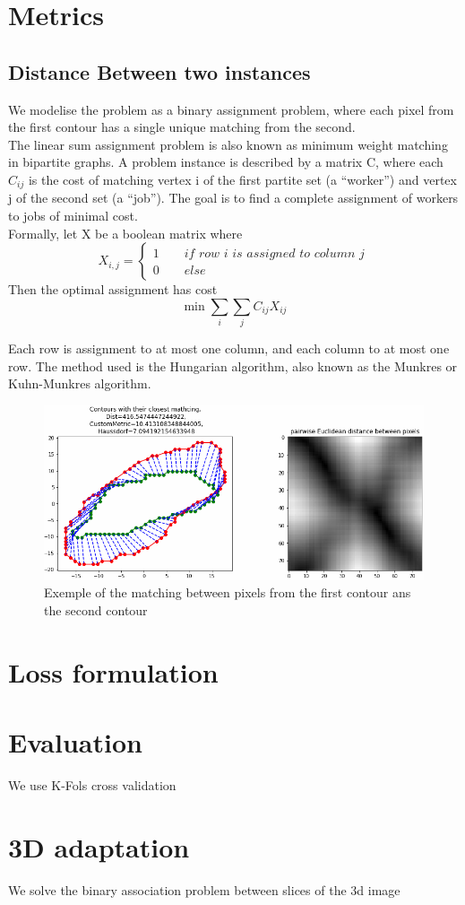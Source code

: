 \documentclass[main.tex]{subfiles}
\begin{document}
\section{Metrics}
\subsection{Distance Between two instances}
We modelise the problem as a binary assignment problem, where each pixel from the first contour has a single unique matching from the second.\\

The linear sum assignment problem is also known as minimum weight matching in bipartite graphs. A problem instance is described by a matrix C, where each $C_{ij}$ is the cost of matching vertex i of the first partite set (a “worker”) and vertex j of the second set (a “job”). The goal is to find a complete assignment of workers to jobs of minimal cost.\\

Formally, let X be a boolean matrix where 
\begin{equation}
    X_{i,j}=\left\{
                \begin{array}{ll}
                  1 \quad\quad \textit{if row i is assigned to column j}\\
                  0 \quad\quad else
                \end{array}
              \right.
\end{equation}
Then the optimal assignment has cost
\begin{equation}
    \min \sum_i \sum_j C_{ij}X_{ij}
\end{equation}

Each row is assignment to at most one column, and each column to at most one row. The method used is the Hungarian algorithm, also known as the Munkres or Kuhn-Munkres algorithm.

\begin{figure}
    \centering
    \includegraphics[width=16cm]{images/contourMatching.PNG}
    \caption{Exemple of the matching between pixels from the first contour ans the second contour}
\end{figure}
\section{Loss formulation}
    
\section{Evaluation}
We use K-Fols cross validation 
\section{3D adaptation}
We solve the binary association problem between slices of the 3d image
\end{document}
